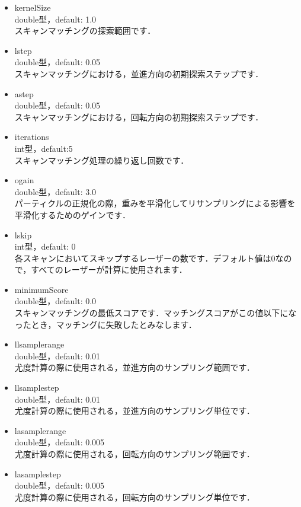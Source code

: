 \documentclass[{../../master}]{subfiles}
\begin{document}
\begin{itemize}
  \item \textsf{kernelSize} \\
    double型，default: 1.0 \\
    スキャンマッチングの探索範囲です．
  \item \textsf{lstep} \\
    double型，default: 0.05 \\
    スキャンマッチングにおける，並進方向の初期探索ステップです．
  \item \textsf{astep} \\
    double型，default: 0.05 \\
    スキャンマッチングにおける，回転方向の初期探索ステップです．
  \item \textsf{iterations} \\
    int型，default:5 \\
    スキャンマッチング処理の繰り返し回数です．
  \item \textsf{ogain} \\
    double型，default: 3.0 \\
    パーティクルの正規化の際，重みを平滑化してリサンプリングによる影響を平滑化するためのゲインです．
  \item \textsf{lskip} \\
    int型，default: 0 \\
    各スキャンにおいてスキップするレーザーの数です．デフォルト値は0なので，すべてのレーザーが計算に使用されます．
  \item \textsf{minimumScore} \\
    double型，default: 0.0 \\
    スキャンマッチングの最低スコアです．マッチングスコアがこの値以下になったとき，マッチングに失敗したとみなします．
  \item \textsf{llsamplerange} \\
    double型，default: 0.01 \\
    尤度計算の際に使用される，並進方向のサンプリング範囲です．
  \item \textsf{llsamplestep} \\
    double型，default: 0.01 \\
    尤度計算の際に使用される，並進方向のサンプリング単位です．
  \item \textsf{lasamplerange} \\
    double型，default: 0.005 \\
    尤度計算の際に使用される，回転方向のサンプリング範囲です．
  \item \textsf{lasamplestep} \\
    double型，default: 0.005 \\
    尤度計算の際に使用される，回転方向のサンプリング単位です．
\end{itemize}
\end{document}
